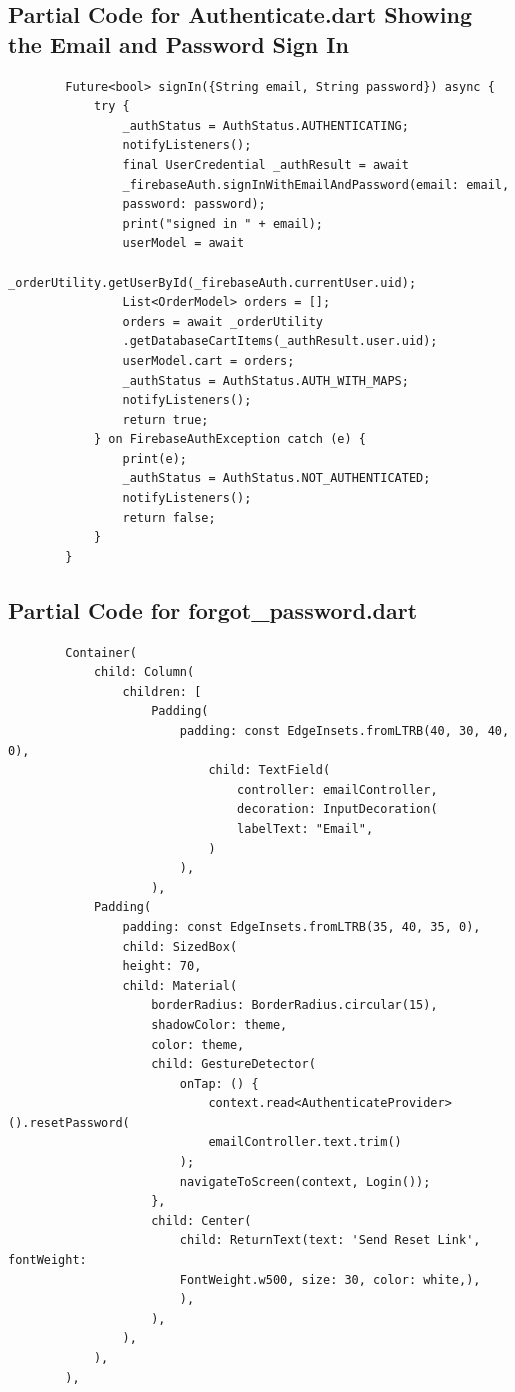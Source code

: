 \documentclass[12pt]{article}
\begin{document}
	\subsection{Partial Code for Authenticate.dart Showing the Email and Password Sign In}
	\label{code:authenticate}
	\begin{verbatim}
		Future<bool> signIn({String email, String password}) async {
			try {
				_authStatus = AuthStatus.AUTHENTICATING;
				notifyListeners();
				final UserCredential _authResult = await
				_firebaseAuth.signInWithEmailAndPassword(email: email, 
				password: password);
				print("signed in " + email);
				userModel = await
				_orderUtility.getUserById(_firebaseAuth.currentUser.uid);
				List<OrderModel> orders = [];
				orders = await _orderUtility
				.getDatabaseCartItems(_authResult.user.uid);
				userModel.cart = orders;
				_authStatus = AuthStatus.AUTH_WITH_MAPS;
				notifyListeners();
				return true;
			} on FirebaseAuthException catch (e) {
				print(e);
				_authStatus = AuthStatus.NOT_AUTHENTICATED;
				notifyListeners();
				return false;
			}
		}
	\end{verbatim}

	\subsection{Partial Code for forgot\_password.dart}
	\label{code:forgot-password}
	
	\begin{verbatim}
		Container(
			child: Column(
				children: [
					Padding(
						padding: const EdgeInsets.fromLTRB(40, 30, 40, 0),
							child: TextField(
								controller: emailController,
								decoration: InputDecoration(
								labelText: "Email",
							)
						),
					),
			Padding(
				padding: const EdgeInsets.fromLTRB(35, 40, 35, 0),
				child: SizedBox(
				height: 70,
				child: Material(
					borderRadius: BorderRadius.circular(15),
					shadowColor: theme,
					color: theme,
					child: GestureDetector(
						onTap: () {
							context.read<AuthenticateProvider>().resetPassword(
							emailController.text.trim()
						);
						navigateToScreen(context, Login());
					},
					child: Center(
						child: ReturnText(text: 'Send Reset Link', fontWeight:
						FontWeight.w500, size: 30, color: white,),
						),
					),
				),
			),
		),

	\end{verbatim}
\end{document}
